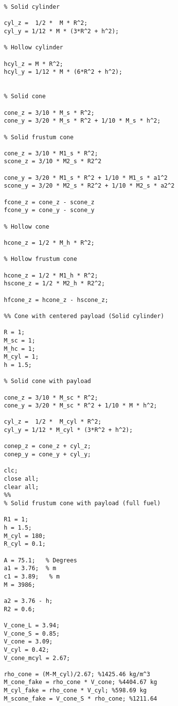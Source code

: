 \label{app:SorenMatlab}

\begin{lstlisting}
% Solid cylinder 

cyl_z =  1/2 *  M * R^2;
cyl_y = 1/12 * M * (3*R^2 + h^2);

% Hollow cylinder

hcyl_z = M * R^2;
hcyl_y = 1/12 * M * (6*R^2 + h^2);


% Solid cone

cone_z = 3/10 * M_s * R^2;
cone_y = 3/20 * M_s * R^2 + 1/10 * M_s * h^2;

% Solid frustum cone

cone_z = 3/10 * M1_s * R^2;
scone_z = 3/10 * M2_s * R2^2

cone_y = 3/20 * M1_s * R^2 + 1/10 * M1_s * a1^2
scone_y = 3/20 * M2_s * R2^2 + 1/10 * M2_s * a2^2

fcone_z = cone_z - scone_z
fcone_y = cone_y - scone_y

% Hollow cone

hcone_z = 1/2 * M_h * R^2;

% Hollow frustum cone

hcone_z = 1/2 * M1_h * R^2;
hscone_z = 1/2 * M2_h * R2^2;

hfcone_z = hcone_z - hscone_z;

%% Cone with centered payload (Solid cylinder)

R = 1;
M_sc = 1;
M_hc = 1;
M_cyl = 1;
h = 1.5;

% Solid cone with payload

cone_z = 3/10 * M_sc * R^2;
cone_y = 3/20 * M_sc * R^2 + 1/10 * M * h^2;

cyl_z =  1/2 *  M_cyl * R^2;
cyl_y = 1/12 * M_cyl * (3*R^2 + h^2);

conep_z = cone_z + cyl_z;
conep_y = cone_y + cyl_y;

clc;
close all;
clear all;
%%
% Solid frustum cone with payload (full fuel)

R1 = 1;
h = 1.5;
M_cyl = 180;
R_cyl = 0.1;

A = 75.1;   % Degrees
a1 = 3.76;  % m
c1 = 3.89;   % m
M = 3986;

a2 = 3.76 - h;
R2 = 0.6;

V_cone_L = 3.94; 
V_cone_S = 0.85;
V_cone = 3.09;
V_cyl = 0.42;
V_cone_mcyl = 2.67;

rho_cone = (M-M_cyl)/2.67; %1425.46 kg/m^3
M_cone_fake = rho_cone * V_cone; %4404.67 kg
M_cyl_fake = rho_cone * V_cyl; %598.69 kg
M_scone_fake = V_cone_S * rho_cone; %1211.64


\end{lstlisting}
